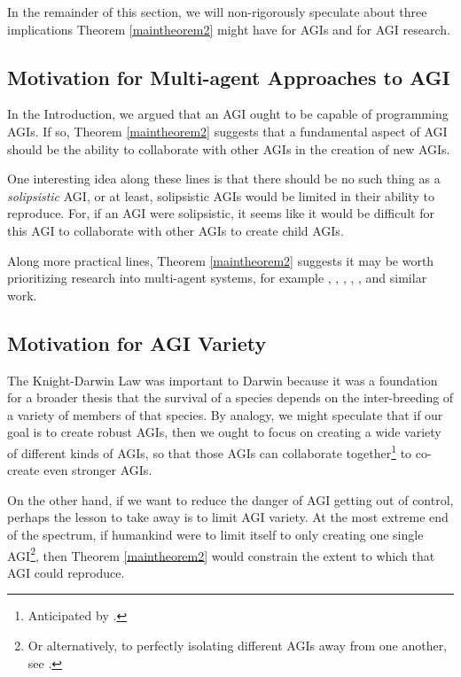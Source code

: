 \documentclass[runningheads]{llncs}
\begin{document}
In the remainder of this section, we will non-rigorously speculate about three implications
Theorem \ref{maintheorem2} might have for AGIs and for AGI research.


\subsection{Motivation for Multi-agent Approaches to AGI}

In the Introduction, we argued that an AGI ought to be
capable of programming AGIs. If so, Theorem \ref{maintheorem2} suggests
that a fundamental aspect of AGI should be the ability to collaborate with other
AGIs in the creation of new AGIs.

One interesting idea along these lines is that there should be no
such thing as a \emph{solipsistic} AGI, or at least, solipsistic AGIs would be
limited in their ability to reproduce.
For, if an AGI were solipsistic, it
seems like it would be difficult for this AGI to collaborate with other AGIs
to create child AGIs.

Along more practical lines, Theorem \ref{maintheorem2} suggests it may be worth
prioritizing research into multi-agent systems, for example
\cite{castelfranchi1998modelling}, \cite{hibbard2011societies}, \cite{lazaridou2018emergence},
\cite{thorisson2004constructionist}, \cite{potyka2016group},
and similar work.

\subsection{Motivation for AGI Variety}

The Knight-Darwin Law was important to
Darwin because it was a foundation for a broader thesis that the survival of a
species depends on the inter-breeding of a variety of members of that species.
By analogy, we might speculate that if our goal is to create robust AGIs, then
we ought to focus on creating a wide variety of different kinds of AGIs, so that
those AGIs can collaborate together\footnote{Anticipated
by \cite{dai2011artificial}.} to co-create even stronger AGIs.

On the other hand, if we want to reduce the danger of AGI getting out of control,
perhaps the lesson to take away is to limit AGI variety. At the most extreme end
of the spectrum, if humankind were to limit itself to only creating one single
AGI\footnote{Or alternatively, to perfectly isolating
different AGIs away from
one another, see \cite{yampolskiy2012leakproofing}.}, then
Theorem \ref{maintheorem2} would constrain the extent to which
that AGI could reproduce.
\end{document}
